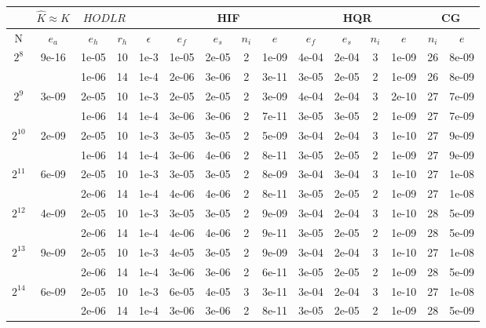 \documentclass[11pt]{article}
\begin{document}
\begin{table}[!htbp]
\centering
\begin{tabular}{|c|c|c|c|c|c|c|c|c|c|c|c|c|c|c|}
\hline
\multicolumn{1}{c|}{} & \multicolumn{1}{c|}{$\hat{K} \approx K$} & \multicolumn{2}{c|}{$HODLR$} & \multicolumn{1}{c|}{} &\multicolumn{4}{c|}{HIF} & \multicolumn{4}{c|}{HQR} & \multicolumn{2}{c|}{CG} \\
\hline
N & $e_{a}$ & $e_{h}$ & $r_{h}$ & $\epsilon$ & $e_{f}$ & $e_{s}$ & $n_{i}$ & $e$ & $e_{f}$  & $e_{s}$ & $n_{i}$ & $e$ &  $n_{i}$ & $e$ \\ 
\hline
$2^{8}$ & 9e-16 & 1e-05 & 10 & 1e-3 & 1e-05 & 2e-05 & 2 & 1e-09 & 4e-04 & 2e-04 & 3 & 1e-09 & 26 & 8e-09\\
~ & ~ & 1e-06 & 14 & 1e-4 & 2e-06 & 3e-06 & 2 & 3e-11 & 3e-05 & 2e-05 & 2 & 1e-09 & 26 & 8e-09\\
\hline
$2^{9}$ & 3e-09 & 2e-05 & 10 & 1e-3 & 2e-05 & 2e-05 & 2 & 3e-09 & 4e-04 & 2e-04 & 3 & 2e-10 & 27 & 7e-09\\
~ & ~ & 1e-06 & 14 & 1e-4 & 3e-06 & 3e-06 & 2 & 7e-11 & 3e-05 & 3e-05 & 2 & 1e-09 & 27 & 7e-09\\
\hline
$2^{10}$ & 2e-09 & 2e-05 & 10 & 1e-3 & 3e-05 & 3e-05 & 2 & 5e-09 & 3e-04 & 2e-04 & 3 & 1e-10 & 27 & 9e-09\\
~ & ~ & 1e-06 & 14 & 1e-4 & 3e-06 & 4e-06 & 2 & 8e-11 & 3e-05 & 2e-05 & 2 & 1e-09 & 27 & 9e-09\\
\hline
$2^{11}$ & 6e-09 & 2e-05 & 10 & 1e-3 & 3e-05 & 3e-05 & 2 & 8e-09 & 3e-04 & 3e-04 & 3 & 1e-10 & 27 & 1e-08\\
~ & ~ & 2e-06 & 14 & 1e-4 & 4e-06 & 4e-06 & 2 & 8e-11 & 3e-05 & 2e-05 & 2 & 1e-09 & 27 & 1e-08\\
\hline
$2^{12}$ & 4e-09 & 2e-05 & 10 & 1e-3 & 3e-05 & 3e-05 & 2 & 9e-09 & 3e-04 & 2e-04 & 3 & 1e-10 & 28 & 5e-09\\
~ & ~ & 2e-06 & 14 & 1e-4 & 4e-06 & 4e-06 & 2 & 9e-11 & 3e-05 & 2e-05 & 2 & 1e-09 & 28 & 5e-09\\
\hline
$2^{13}$ & 9e-09 & 2e-05 & 10 & 1e-3 & 4e-05 & 3e-05 & 2 & 9e-09 & 3e-04 & 2e-04 & 3 & 1e-10 & 27 & 1e-08\\
~ & ~ & 2e-06 & 14 & 1e-4 & 3e-06 & 3e-06 & 2 & 6e-11 & 3e-05 & 2e-05 & 2 & 1e-09 & 28 & 5e-09\\
\hline
$2^{14}$ & 6e-09 & 2e-05 & 10 & 1e-3 & 6e-05 & 4e-05 & 3 & 3e-11 & 3e-04 & 2e-04 & 3 & 1e-10 & 27 & 1e-08\\
~ & ~ & 2e-06 & 14 & 1e-4 & 3e-06 & 3e-06 & 2 & 8e-11 & 3e-05 & 2e-05 & 2 & 1e-09 & 28 & 5e-09\\

\end{tabular}
\end{table}
\end{document}
